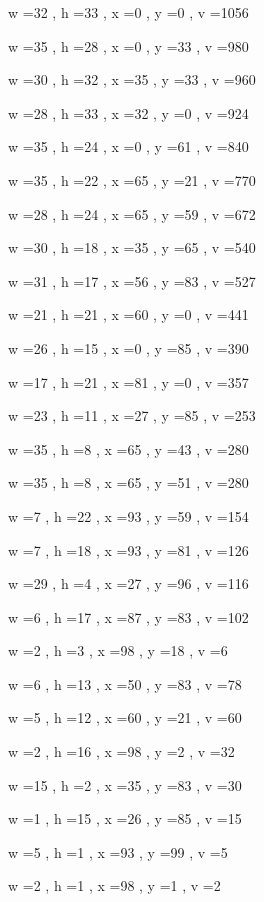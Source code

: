 \documentclass[11pt]{article}
\begin{document}
w =32 , h =33 , x =0 , y =0 , v =1056
\par
w =35 , h =28 , x =0 , y =33 , v =980
\par
w =30 , h =32 , x =35 , y =33 , v =960
\par
w =28 , h =33 , x =32 , y =0 , v =924
\par
w =35 , h =24 , x =0 , y =61 , v =840
\par
w =35 , h =22 , x =65 , y =21 , v =770
\par
w =28 , h =24 , x =65 , y =59 , v =672
\par
w =30 , h =18 , x =35 , y =65 , v =540
\par
w =31 , h =17 , x =56 , y =83 , v =527
\par
w =21 , h =21 , x =60 , y =0 , v =441
\par
w =26 , h =15 , x =0 , y =85 , v =390
\par
w =17 , h =21 , x =81 , y =0 , v =357
\par
w =23 , h =11 , x =27 , y =85 , v =253
\par
w =35 , h =8 , x =65 , y =43 , v =280
\par
w =35 , h =8 , x =65 , y =51 , v =280
\par
w =7 , h =22 , x =93 , y =59 , v =154
\par
w =7 , h =18 , x =93 , y =81 , v =126
\par
w =29 , h =4 , x =27 , y =96 , v =116
\par
w =6 , h =17 , x =87 , y =83 , v =102
\par
w =2 , h =3 , x =98 , y =18 , v =6
\par
w =6 , h =13 , x =50 , y =83 , v =78
\par
w =5 , h =12 , x =60 , y =21 , v =60
\par
w =2 , h =16 , x =98 , y =2 , v =32
\par
w =15 , h =2 , x =35 , y =83 , v =30
\par
w =1 , h =15 , x =26 , y =85 , v =15
\par
w =5 , h =1 , x =93 , y =99 , v =5
\par
w =2 , h =1 , x =98 , y =1 , v =2
\par
\newpage
\end{document}
